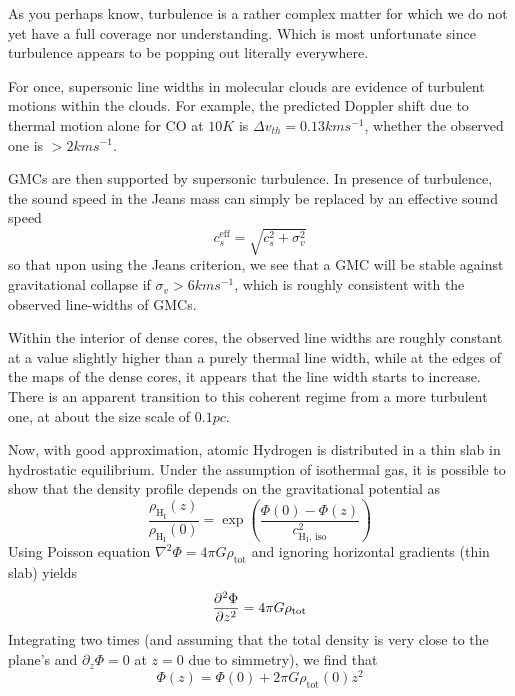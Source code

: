 As you perhaps know, turbulence is a rather complex matter for which we do not yet have a full coverage nor understanding. Which is most unfortunate since turbulence appears to be popping out literally everywhere.
\par For once, supersonic line widths in molecular clouds are evidence of turbulent motions within the clouds. For example, the predicted Doppler shift due to thermal motion alone for CO at $10\unit{K}$ is $\Delta v_{th} = 0.13\unit{km}\unit{s}^{-1}$, whether the observed one is $> 2\unit{km}\unit{s}^{-1}$.
\par GMCs are then supported by supersonic turbulence. In presence of turbulence, the sound speed in the Jeans mass can simply be replaced by an effective sound speed
\begin{equation*}
    c_{s}^{\text{eff}} = \sqrt{c_{s}^{2}+\sigma_{v}^{2}}
\end{equation*}
so that upon using the Jeans criterion, we see that a GMC will be stable against gravitational collapse if $ \sigma_{v} > 6\unit{km}\unit{s}^{-1}$, which is roughly consistent with the observed line-widths of GMCs.
\par Within the interior of dense cores, the observed line widths are roughly constant at a value slightly higher than a purely thermal line width, while at the edges of the maps of the dense cores, it appears that the line width starts to increase. There is an apparent transition to this coherent regime from a more turbulent one, at about the size scale of $ 0.1\unit{pc}$.
\par Now, with good approximation, atomic Hydrogen is distributed in a thin slab in hydrostatic equilibrium. Under the assumption of isothermal gas, it is possible to show that the density profile depends on the gravitational potential as
\begin{equation*}
    \frac{\rho_{\text{H}_{\text{I}}}(z)}{\rho_{\text{H}_{\text{I}}}(0)} = \exp\left(\frac{\Phi(0)-\Phi(z)}{c_{\text{H}_{\text{I}}, \,\text{iso}}^{2}}\right)
\end{equation*}
Using Poisson equation $\nabla^{2}\Phi = 4\pi G \rho_{\text{tot}}$ and ignoring horizontal gradients (thin slab) yields
\begin{equation*}
    \frac{\partial^{2} \Phi}{\partial z^{2}} = 4\pi G \rho_{\text{tot}}
\end{equation*}
Integrating two times (and assuming that the total density is very close to the plane's and $\partial_{z}\Phi = 0$ at $z=0$ due to simmetry), we find that
\begin{equation*}
    \Phi(z) = \Phi(0)+2\pi G \rho_{\text{tot}}(0)z^{2}
\end{equation*}
